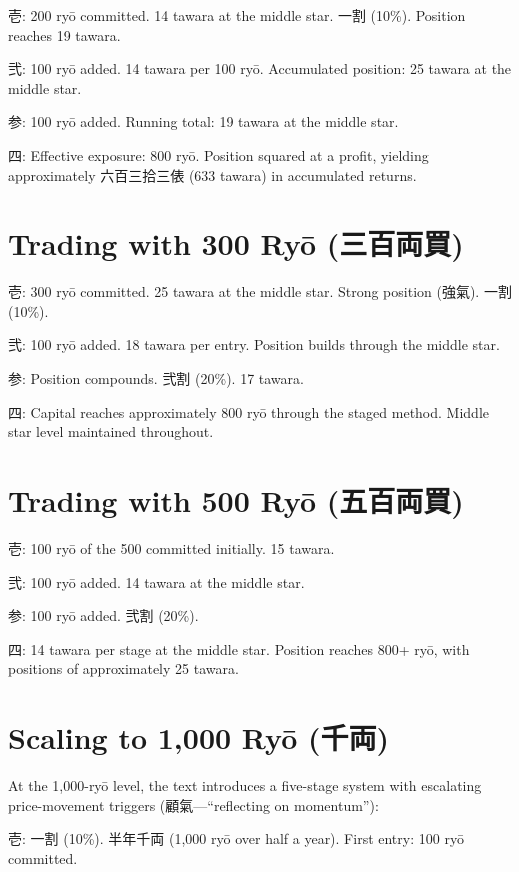 \documentclass[10pt, openany]{book}
\newcommand{\jp}[1]{{\japanesefont #1}}
\begin{document}
\jp{壱}: 200 ry\=o committed. 14 tawara at the middle star.
\jp{一割} (10\%). Position reaches 19 tawara.

\jp{弐}: 100 ry\=o added. 14 tawara per 100 ry\=o. Accumulated
position: 25 tawara at the middle star.

\jp{参}: 100 ry\=o added. Running total: 19 tawara at the middle star.

\jp{四}: Effective exposure: 800 ry\=o. Position squared at a profit,
yielding approximately \jp{六百三拾三俵} (633 tawara) in accumulated
returns.

\section{Trading with 300 Ry\=o (\jp{三百両買})}

\jp{壱}: 300 ry\=o committed. 25 tawara at the middle star.
Strong position (\jp{強氣}). \jp{一割} (10\%).

\jp{弐}: 100 ry\=o added. 18 tawara per entry. Position builds through
the middle star.

\jp{参}: Position compounds. \jp{弐割} (20\%). 17 tawara.

\jp{四}: Capital reaches approximately 800 ry\=o through the staged
method. Middle star level maintained throughout.

\section{Trading with 500 Ry\=o (\jp{五百両買})}

\jp{壱}: 100 ry\=o of the 500 committed initially. 15 tawara.

\jp{弐}: 100 ry\=o added. 14 tawara at the middle star.

\jp{参}: 100 ry\=o added. \jp{弐割} (20\%).

\jp{四}: 14 tawara per stage at the middle star. Position reaches 800+
ry\=o, with positions of approximately 25 tawara.

\section{Scaling to 1,000 Ry\=o (\jp{千両})}

At the 1,000-ry\=o level, the text introduces a five-stage system with
escalating price-movement triggers (\jp{顧氣}---``reflecting on
momentum''):

\jp{壱}: \jp{一割} (10\%). \jp{半年千両} (1,000 ry\=o over half a
year). First entry: 100 ry\=o committed.
\end{document}
